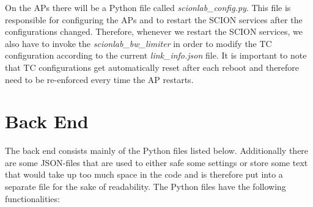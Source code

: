 On the \aclp{AP} there will be a Python file called \textit{scionlab\_config.py}. This file is responsible for configuring the \acsp{AP} and to restart the \acs{SCION} services after the configurations changed. Therefore, whenever we restart the \acs{SCION} services, we also have to invoke the \textit{scionlab\_bw\_limiter} in order to modify the \acs{TC} configuration according to the current \textit{link\_info.json} file. It is important to note that \acs{TC} configurations get automatically reset after each reboot and therefore need to be re-enforced every time the \acs{AP} restarts.

\section{Back End}

The back end consists mainly of the Python files listed below. Additionally there are some \acs{JSON}-files that are used to either safe some settings or store some text that would take up too much space in the code and is therefore put into a separate file for the sake of readability. The Python files have the following functionalities:

